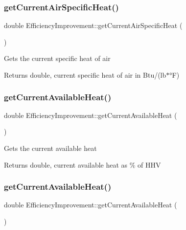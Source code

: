 \subsubsection{\texorpdfstring{get\+Current\+Air\+Specific\+Heat()}{getCurrentAirSpecificHeat()}\hspace{0.1cm}{\footnotesize\ttfamily [3/3]}}
{\footnotesize\ttfamily double Efficiency\+Improvement\+::get\+Current\+Air\+Specific\+Heat (\begin{DoxyParamCaption}{ }\end{DoxyParamCaption})}

Gets the current specific heat of air

\begin{DoxyReturn}{Returns}
double, current specific heat of air in Btu/(lb$\ast$°F) 
\end{DoxyReturn}
\mbox{\label{class_efficiency_improvement_a4f1ef470ee88c9d3ac05be0bd5755157}} 
\subsubsection{\texorpdfstring{get\+Current\+Available\+Heat()}{getCurrentAvailableHeat()}\hspace{0.1cm}{\footnotesize\ttfamily [1/3]}}
{\footnotesize\ttfamily double Efficiency\+Improvement\+::get\+Current\+Available\+Heat (\begin{DoxyParamCaption}{ }\end{DoxyParamCaption})}

Gets the current available heat

\begin{DoxyReturn}{Returns}
double, current available heat as \% of H\+HV 
\end{DoxyReturn}
\mbox{\label{class_efficiency_improvement_a4f1ef470ee88c9d3ac05be0bd5755157}} 
\subsubsection{\texorpdfstring{get\+Current\+Available\+Heat()}{getCurrentAvailableHeat()}\hspace{0.1cm}{\footnotesize\ttfamily [2/3]}}
{\footnotesize\ttfamily double Efficiency\+Improvement\+::get\+Current\+Available\+Heat (\begin{DoxyParamCaption}{ }\end{DoxyParamCaption})}

